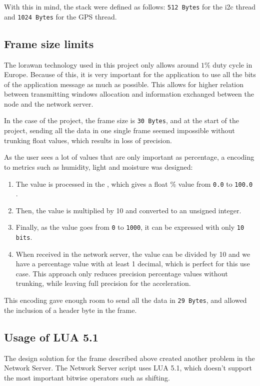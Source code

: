 With this in mind, the stack were defined as follows: \texttt{512 Bytes} for the \acrshort{i2c} thread and \texttt{1024 Bytes} for the GPS thread.

\subsection{Frame size limits}

The \acrshort{lorawan} technology used in this project only allows around $1\%$ duty cycle in Europe. Because of this, it is very important for the application to use all the bits of the application message as much as possible. This allows for higher relation between transmitting windows allocation and information exchanged between the node and the network server.

In the case of the project, the frame size is \texttt{30 Bytes}, and at the start of the project, sending all the data in one single frame seemed impossible without trunking float values, which results in loss of precision.

As the user sees a lot of values that are only important as percentage, a encoding to metrics such as humidity, light and moisture was designed:
\begin{enumerate}
    \item The value is processed in the , which gives a float \% value from \texttt{0.0} to \texttt{100.0} .
    \item Then, the value is multiplied by 10 and converted to an unsigned integer.
    \item Finally, as the value goes from \texttt{0} to \texttt{1000}, it can be expressed with only \texttt{10 bits}.
    \item When received in the network server, the value can be divided by 10 and we have a percentage value with at least 1 decimal, which is perfect for this use case. 
    This approach only reduces precision percentage values without trunking, while leaving full precision for the acceleration.
\end{enumerate}

This encoding gave enough room to send all the data in \texttt{29 Bytes}, and allowed the inclusion of a header byte in the frame.

\subsection{Usage of LUA 5.1}

The design solution for the frame described above created another problem in the Network Server. The Network Server script 
uses LUA 5.1, which doesn't support the most important bitwise operators\cite{luauserswikiBitwise} such as shifting.

